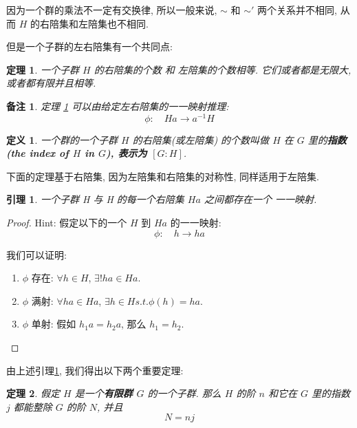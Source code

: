 \documentclass[utf8]{ctexbook}
\newtheorem{theorem}{定理}[section]
\newtheorem{definition}{定义}[section]
\newtheorem{memo}{备注}[section]
\newtheorem{lemma}{引理}[section]
\begin{document}
因为一个群的乘法不一定有交换律, 所以一般来说, $\sim$ 和 $\sim'$ 两个关系并不相同, 从而 $H$ 的右陪集和左陪集也不相同.

但是一个子群的左右陪集有一个共同点:
\begin{theorem}\label{thm_left_right_coset}
一个子群 $H$ 的右陪集的个数 和 左陪集的个数相等. 它们或者都是无限大, 或者都有限并且相等.
\end{theorem}

\begin{memo}
定理 \ref{thm_left_right_coset} 可以由给定左右陪集的一一映射推理:
\begin{equation*}
\phi: \quad Ha \longrightarrow a^{-1} H
\end{equation*}
\end{memo}

\begin{definition}
一个群的一个子群 $H$ 的右陪集(或左陪集) 的个数叫做 $H$ 在 $G$ 里的\textbf{指数(the index of $H$ in $G$), 表示为 $[G: H]$}.
\end{definition}

下面的定理基于右陪集, 因为左陪集和右陪集的对称性, 同样适用于左陪集.

\begin{lemma}\label{lemma_H_iso_Ha}
一个子群 H 与 H 的每一个右陪集 $Ha$ 之间都存在一个 一一映射.
\end{lemma}

\begin{proof}
Hint: 假定以下的一个 $H$ 到 $Ha$ 的一一映射:
\begin{equation*}
\phi: \quad h \longrightarrow ha
\end{equation*}

我们可以证明:
\begin{enumerate}
\item{$\phi$ 存在: $\forall h \in H$, $\exists ! ha \in Ha $.}
\item{$\phi$ 满射: $\forall ha \in Ha$, $\exists h \in H s.t. \phi(h) = ha $.}
\item{$\phi$ 单射: 假如 $h_1 a = h_2 a$, 那么 $h_1 = h_2$. }
\end{enumerate}

\end{proof}


由上述引理\ref{lemma_H_iso_Ha}, 我们得出以下两个重要定理:

\begin{theorem}\label{theorem_counting_formula}
假定 $H$ 是一个\textbf{有限群 $G$} 的一个子群. 那么 $H$ 的阶 $n$ 和它在 $G$ 里的指数 $j$ 都能整除 $G$ 的阶 $N$, 并且
\begin{equation}
N = n j \label{eq_counting_formula}
\end{equation}

\end{theorem}
\end{document}
